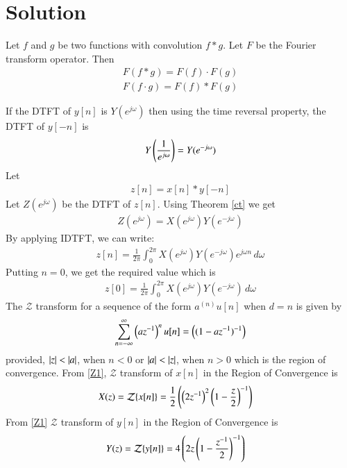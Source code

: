 \documentclass[journal,12pt,twocolumn]{IEEEtran}
\begin{document}
\section{Solution}
\begin{theorem} \label{ct}
Let $f$ and $g$ be two functions with convolution $f*g$. Let $F$ be the Fourier transform operator. Then
\begin{align}
F(f * g)=F(f) \cdot F(g)\\
F(f \cdot g)=F(f) * F(g)
\end{align}
\end{theorem}
If the DTFT of $y[n]$ is $Y(e^{j\omega})$  then using the time reversal property, the DTFT of $y[-n]$ is 
\begin{align}
Y\left(\frac{1}{e^{j\omega}}\right)=Y(e^{-j\omega})  
\end{align}
Let 
\begin{align} \label{convolu}
    z[n]=x[n]*y[-n]
\end{align}
Let $Z(e^{j\omega})$ be the DTFT of $z[n]$. Using Theorem \ref{ct} we get
\begin{align}
  Z(e^{j\omega})= X(e^{j\omega}) Y(e^{-j\omega}) 
\end{align}
By applying IDTFT, we can write:
\begin{align}
z[n]=\frac{1}{2\pi} \int_{0}^{2\pi} X(e^{j\omega}) Y(e^{-j\omega}) e^{j\omega n}\, d\omega  
\end{align}
Putting $n=0$, we get the required value which is
\begin{align}
z[0]=\frac{1}{2\pi} \int_{0}^{2\pi} X(e^{j\omega}) Y(e^{-j\omega})\, d\omega 
\end{align}
The $\mathcal{Z}$ transform for a sequence of the form $a^{(n)}u[n]$ when $d=n$ is given by
\begin{align}\label{Z1}
\sum _{n=-\infty }^{\infty }\left({az^{-1}}\right)^n u[n]
=\left(({1-az^{-1}})^{-1}\right)
\end{align}
provided, $\vert z\vert<\vert a\vert$, when $n<0$ or  $\vert a\vert<\vert z\vert$, when $n>0$ which is the region of convergence.
From \eqref{Z1}, $\mathcal{Z} $ transform of $x[n]$ in the Region of Convergence is
\begin{align}
    X(z)&={\mathcal {Z}}\{x[n]\}
    =\frac{1}{2}\left({\left(2z^{-1}\right)^2}\left(1-\frac{z}{2}\right)^{-1}\right)
\end{align}
From \eqref{Z1} $\mathcal{Z} $ transform of $y[n]$ in the Region of Convergence is
\begin{align}
    Y(z)&={\mathcal {Z}}\{y[n]\}=4\left({2z}\left(1-\frac{z^{-1}}{2}\right)^{-1}\right)
\end{align}
\end{document}
